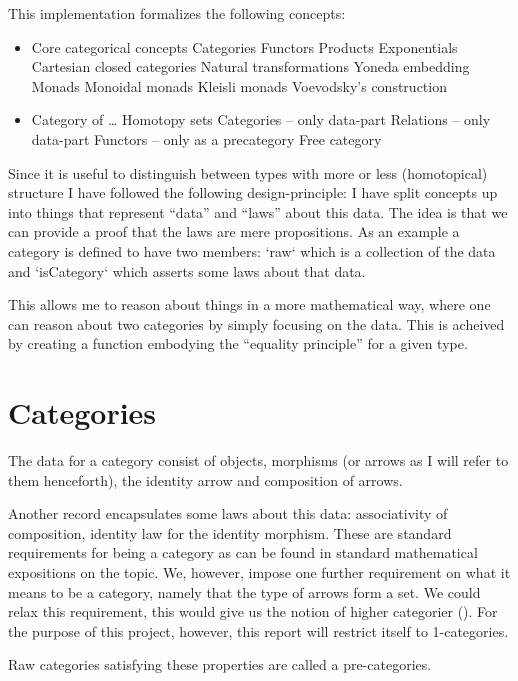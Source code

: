 This implementation formalizes the following concepts:
%
\begin{itemize}
\item Core categorical concepts
\subitem Categories
\subitem Functors
\subitem Products
\subitem Exponentials
\subitem Cartesian closed categories
\subitem Natural transformations
\subitem Yoneda embedding
\subitem Monads
\subsubitem Monoidal monads
\subsubitem Kleisli monads
\subsubitem Voevodsky's construction
\item Category of \ldots
\subitem Homotopy sets
\subitem Categories -- only data-part
\subitem Relations -- only data-part
\subitem Functors -- only as a precategory
\subitem Free category
\end{itemize}
%
Since it is useful to distinguish between types with more or less (homotopical)
structure I have followed the following design-principle: I have split concepts
up into things that represent ``data'' and ``laws'' about this data. The idea is
that we can provide a proof that the laws are mere propositions. As an example a
category is defined to have two members: `raw` which is a collection of the data
and `isCategory` which asserts some laws about that data.

This allows me to reason about things in a more mathematical way, where one can
reason about two categories by simply focusing on the data. This is acheived by
creating a function embodying the ``equality principle'' for a given type.

\section{Categories}
The data for a category consist of objects, morphisms (or arrows as I will refer
to them henceforth), the identity arrow and composition of arrows.

Another record encapsulates some laws about this data: associativity of
composition, identity law for the identity morphism. These are standard
requirements for being a category as can be found in standard mathematical
expositions on the topic. We, however, impose one further requirement on what it
means to be a category, namely that the type of arrows form a set. We could
relax this requirement, this would give us the notion of higher categorier
(\cite[p. 307]{hott-2013}). For the purpose of this project, however, this
report will restrict itself to 1-categories.

Raw categories satisfying these properties are called a pre-categories.

